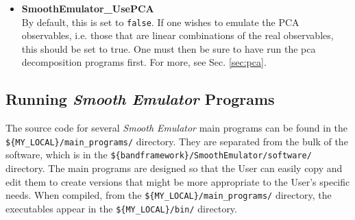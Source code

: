 \documentclass[UserManual.tex]{subfiles}
\begin{document}
\begin{itemize}
\item {\bf SmoothEmulator\_UsePCA}\\
By default, this is set to {\tt false}. If one wishes to emulate the PCA observables, i.e. those that are linear combinations of the real observables, this should be set to true. One must then be sure to have run the pca decomposition programs first. For more, see Sec. \ref{sec:pca}. 

\end{itemize}

\subsection{Running {\it Smooth Emulator} Programs}

The source code for several {\it Smooth Emulator} main programs can be found in the \\{\tt \$\{MY\_LOCAL\}/main\_programs/} directory. They are separated from the bulk of the software, which is in the {\tt \$\{bandframework\}/SmoothEmulator/software/} directory. The main programs are designed so that the User can easily copy and edit them to create versions that might be more appropriate to the User's specific needs. When compiled, from the {\tt \$\{MY\_LOCAL\}/main\_programs/} directory, the executables appear in the {\tt \$\{MY\_LOCAL\}/bin/} directory. 
\end{document}

